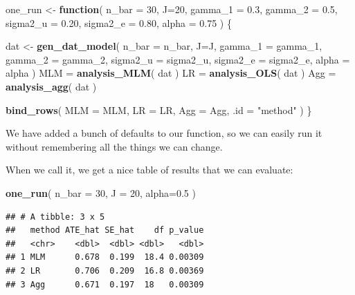 \documentclass[
]{book}
\newenvironment{Shaded}{\begin{snugshade}}{\end{snugshade}}
\newcommand{\AttributeTok}[1]{\textcolor[rgb]{0.13,0.29,0.53}{#1}}
\newcommand{\ControlFlowTok}[1]{\textcolor[rgb]{0.13,0.29,0.53}{\textbf{#1}}}
\newcommand{\DecValTok}[1]{\textcolor[rgb]{0.00,0.00,0.81}{#1}}
\newcommand{\FloatTok}[1]{\textcolor[rgb]{0.00,0.00,0.81}{#1}}
\newcommand{\FunctionTok}[1]{\textcolor[rgb]{0.13,0.29,0.53}{\textbf{#1}}}
\newcommand{\NormalTok}[1]{#1}
\newcommand{\OtherTok}[1]{\textcolor[rgb]{0.56,0.35,0.01}{#1}}
\newcommand{\StringTok}[1]{\textcolor[rgb]{0.31,0.60,0.02}{#1}}
\begin{document}
\begin{Shaded}
\begin{Highlighting}[]
\NormalTok{one\_run }\OtherTok{\textless{}{-}} \ControlFlowTok{function}\NormalTok{( }\AttributeTok{n\_bar =} \DecValTok{30}\NormalTok{, }\AttributeTok{J=}\DecValTok{20}\NormalTok{, }
                     \AttributeTok{gamma\_1 =} \FloatTok{0.3}\NormalTok{, }\AttributeTok{gamma\_2 =} \FloatTok{0.5}\NormalTok{,}
                     \AttributeTok{sigma2\_u =} \FloatTok{0.20}\NormalTok{, }\AttributeTok{sigma2\_e =} \FloatTok{0.80}\NormalTok{,}
                     \AttributeTok{alpha =} \FloatTok{0.75}\NormalTok{ ) \{}
  
\NormalTok{  dat }\OtherTok{\textless{}{-}} \FunctionTok{gen\_dat\_model}\NormalTok{( }\AttributeTok{n\_bar =}\NormalTok{ n\_bar, }\AttributeTok{J=}\NormalTok{J, }
                        \AttributeTok{gamma\_1 =}\NormalTok{ gamma\_1, }\AttributeTok{gamma\_2 =}\NormalTok{ gamma\_2,}
                        \AttributeTok{sigma2\_u =}\NormalTok{ sigma2\_u, }\AttributeTok{sigma2\_e =}\NormalTok{ sigma2\_e,}
                        \AttributeTok{alpha =}\NormalTok{ alpha )}
\NormalTok{  MLM }\OtherTok{=} \FunctionTok{analysis\_MLM}\NormalTok{( dat )}
\NormalTok{  LR }\OtherTok{=} \FunctionTok{analysis\_OLS}\NormalTok{( dat )}
\NormalTok{  Agg }\OtherTok{=} \FunctionTok{analysis\_agg}\NormalTok{( dat )}
  
  \FunctionTok{bind\_rows}\NormalTok{( }\AttributeTok{MLM =}\NormalTok{ MLM, }\AttributeTok{LR =}\NormalTok{ LR, }\AttributeTok{Agg =}\NormalTok{ Agg,}
             \AttributeTok{.id =} \StringTok{"method"}\NormalTok{ )}
\NormalTok{\}}
\end{Highlighting}
\end{Shaded}

We have added a bunch of defaults to our function, so we can easily run it without remembering all the things we can change.

When we call it, we get a nice table of results that we can evaluate:

\begin{Shaded}
\begin{Highlighting}[]
\FunctionTok{one\_run}\NormalTok{( }\AttributeTok{n\_bar =} \DecValTok{30}\NormalTok{, }\AttributeTok{J =} \DecValTok{20}\NormalTok{, }\AttributeTok{alpha=}\FloatTok{0.5}\NormalTok{ )}
\end{Highlighting}
\end{Shaded}

\begin{verbatim}
## # A tibble: 3 x 5
##   method ATE_hat SE_hat    df p_value
##   <chr>    <dbl>  <dbl> <dbl>   <dbl>
## 1 MLM      0.678  0.199  18.4 0.00309
## 2 LR       0.706  0.209  16.8 0.00369
## 3 Agg      0.671  0.197  18   0.00309
\end{verbatim}
\end{document}
